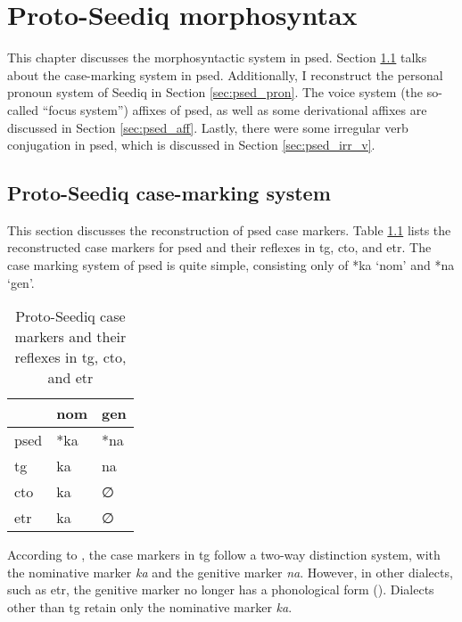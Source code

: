 \chapter{Proto-Seediq morphosyntax} \label{ch5}

This chapter discusses the morphosyntactic system in \acl{psed}. Section \ref{sec:psed_case} talks about the case-marking system in \acl{psed}. Additionally, I reconstruct the personal pronoun system of Seediq in Section \ref{sec:psed_pron}. The voice system (the so-called ``focus system'') affixes of \acl{psed}, as well as some derivational affixes are discussed in Section \ref{sec:psed_aff}. Lastly, there were some irregular verb conjugation in \acl{psed}, which is discussed in Section \ref{sec:psed_irr_v}.

\section{Proto-Seediq case-marking system} \label{sec:psed_case}

This section discusses the reconstruction of \acl{psed} case markers. Table \ref{tab:psed_case} lists the reconstructed case markers for \acl{psed} and their reflexes in \acl{tg}, \acl{cto}, and \acl{etr}. The case marking system of \acl{psed} is quite simple, consisting only of *ka `\acs{nom}' and *na `\acs{gen}'.

\begin{table}[!htbp]
\centering
\caption{Proto-Seediq case markers and their reflexes in \acl{tg}, \acl{cto}, and \acl{etr}}
\label{tab:psed_case}
\begin{tabular}{lll}
\hline
           & \ac{nom} & \ac{gen} \\ \hline
\acs{psed} & *ka      & *na      \\
\ac{tg}    & ka       & na       \\
\ac{cto}   & ka       & ∅        \\
\ac{etr}   & ka       & ∅        \\ \hline
\end{tabular}
\end{table}

According to \textcite{Sung2018Sedgrammar}, the case markers in \acl{tg} follow a two-way distinction system, with the nominative marker \textit{ka} and the genitive marker \textit{na}. However, in other dialects, such as \acl{etr}, the genitive marker no longer has a phonological form (\cite{Lee2018Trugrammar}). Dialects other than \acl{tg} retain only the nominative marker \textit{ka}. 

